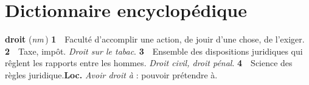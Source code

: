 
\section{Dictionnaire encyclopédique}

{\bf droit} ({\it nm}\,) {\bf 1}\ \ Faculté d'accomplir une action, de jouir d'une chose, de l'exiger. {\bf 2}\ \ Taxe, impôt. {\it Droit sur le tabac}. {\bf 3}\ \ Ensemble des dispositions juridiques qui rêglent les rapports entre les hommes. {\it Droit civil, droit pénal}. {\bf 4}\ \ Science des règles juridique.{\bf Loc.} {\it Avoir droit à} : pouvoir prétendre à.
